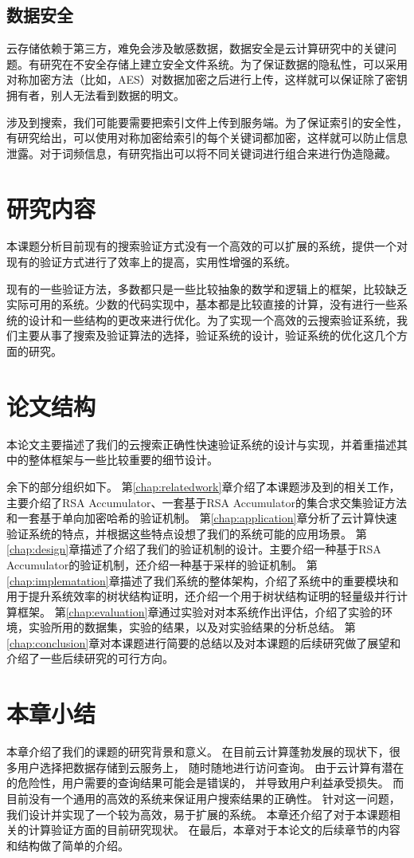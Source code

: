 \subsection{数据安全}
						云存储依赖于第三方，难免会涉及敏感数据，数据安全是云计算研究中的关键问题。有研究在不安全存储上建立安全文件系统。为了保证数据的隐私性，可以采用对称加密方法（比如，AES）对数据加密之后进行上传，这样就可以保证除了密钥拥有者，别人无法看到数据的明文。

						    涉及到搜索，我们可能要需要把索引文件上传到服务端。为了保证索引的安全性，有研究给出，可以使用对称加密给索引的每个关键词都加密，这样就可以防止信息泄露。对于词频信息，有研究指出可以将不同关键词进行组合来进行伪造隐藏。

\section{研究内容}
本课题分析目前现有的搜索验证方式没有一个高效的可以扩展的系统，提供一个对现有的验证方式进行了效率上的提高，实用性增强的系统。

现有的一些验证方法，多数都只是一些比较抽象的数学和逻辑上的框架，比较缺乏实际可用的系统。少数的代码实现中，基本都是比较直接的计算，没有进行一些系统的设计和一些结构的更改来进行优化。为了实现一个高效的云搜索验证系统，我们主要从事了搜索及验证算法的选择，验证系统的设计，验证系统的优化这几个方面的研究。

\section{论文结构}
本论文主要描述了我们的云搜索正确性快速验证系统的设计与实现，并着重描述其中的整体框架与一些比较重要的细节设计。

余下的部分组织如下。
第\ref{chap:relatedwork}章介绍了本课题涉及到的相关工作，主要介绍了RSA Accumulator、一套基于RSA Accumulator的集合求交集验证方法和一套基于单向加密哈希的验证机制。
第\ref{chap:application}章分析了云计算快速验证系统的特点，并根据这些特点设想了我们的系统可能的应用场景。
第\ref{chap:design}章描述了介绍了我们的验证机制的设计。主要介绍一种基于RSA Accumulator的验证机制，还介绍一种基于采样的验证机制。
第\ref{chap:implematation}章描述了我们系统的整体架构，介绍了系统中的重要模块和用于提升系统效率的树状结构证明，还介绍一个用于树状结构证明的轻量级并行计算框架。
第\ref{chap:evaluation}章通过实验对对本系统作出评估，介绍了实验的环境，实验所用的数据集，实验的结果，以及对实验结果的分析总结。
第\ref{chap:conclusion}章对本课题进行简要的总结以及对本课题的后续研究做了展望和介绍了一些后续研究的可行方向。


\section{本章小结}
本章介绍了我们的课题的研究背景和意义。
在目前云计算蓬勃发展的现状下，很多用户选择把数据存储到云服务上，
随时随地进行访问查询。
由于云计算有潜在的危险性，用户需要的查询结果可能会是错误的，
并导致用户利益承受损失。
而目前没有一个通用的高效的系统来保证用户搜索结果的正确性。
针对这一问题，我们设计并实现了一个较为高效，易于扩展的系统。
本章还介绍了对于本课题相关的计算验证方面的目前研究现状。
在最后，本章对于本论文的后续章节的内容和结构做了简单的介绍。
